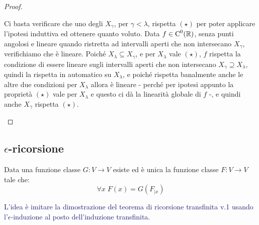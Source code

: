 \begin{proof}
\begin{itemize}
		Ci basta verificare che uno degli $X_\gamma$, per $\gamma < \lambda$, rispetta $(\star)$ per poter applicare l'ipotesi induttiva ed ottenere quanto voluto. Data $f \in \text C^0(\mathbb R)$, senza punti angolosi e lineare quando ristretta ad intervalli aperti che non intersecano 
		$X_\gamma$, verifichiamo che \`e lineare. Poich\'e $X_\lambda \subseteq X_\gamma$, e per $X_\lambda$ vale $(\star)$, $f$ rispetta la condizione di essere lineare sugli intervalli aperti che non intersecano $X_\gamma \supseteq X_\lambda$,
		quindi la rispetta in automatico su $X_\lambda$, e poich\'e rispetta banalmente anche le altre due condizioni per $X_\lambda$ allora \`e lineare - perch\'e per ipotesi appunto la propriet\`a $(\star)$ vale per $X_\lambda$ e questo ci d\`a la linearit\`a globale di $f$ -,
		e quindi anche $X_\gamma$ rispetta $(\star)$.
	\end{itemize}
\end{proof}


\pagebreak
\subsection{\texorpdfstring{$\epsilon$-ricorsione}{epsilon-ricorsione}}
\begin{theorem}
	Data una funzione classe $G : V \to V$ esiste ed \`e unica la funzione classe $F : V \to V$ tale che:
	\[ \forall x \; F(x) = G(F_{|x})
		\]
\end{theorem}

\textcolor{MidnightBlue}{L'idea \`e imitare la dimostrazione del teorema di ricorsione transfinita v.1 usando l'$\epsilon$-induzione al posto dell'induzione transfinita.}

